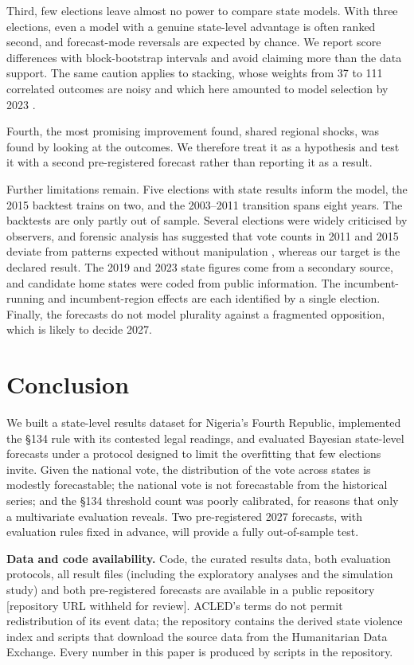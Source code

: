 \documentclass[preprint,12pt,authoryear]{elsarticle}
\begin{document}
Third, few elections leave almost no power to compare state models. With three elections, even a model with a genuine state-level advantage is often ranked second, and forecast-mode reversals are expected by chance. We report score differences with block-bootstrap intervals and avoid claiming more than the data support. The same caution applies to stacking, whose weights from 37 to 111 correlated outcomes are noisy and which here amounted to model selection by 2023 \citep{Claeskens2016Puzzle}.

Fourth, the most promising improvement found, shared regional shocks, was found by looking at the outcomes. We therefore treat it as a hypothesis and test it with a second pre-registered forecast rather than reporting it as a result.

Further limitations remain. Five elections with state results inform the model, the 2015 backtest trains on two, and the 2003--2011 transition spans eight years. The backtests are only partly out of sample. Several elections were widely criticised by observers, and forensic analysis has suggested that vote counts in 2011 and 2015 deviate from patterns expected without manipulation \citep{Tunmibi2021MonteCarlo}, whereas our target is the declared result. The 2019 and 2023 state figures come from a secondary source, and candidate home states were coded from public information. The incumbent-running and incumbent-region effects are each identified by a single election. Finally, the forecasts do not model plurality against a fragmented opposition, which is likely to decide 2027.

\section{Conclusion}
\label{sec:conclusion}
We built a state-level results dataset for Nigeria's Fourth Republic, implemented the \S134 rule with its contested legal readings, and evaluated Bayesian state-level forecasts under a protocol designed to limit the overfitting that few elections invite. Given the national vote, the distribution of the vote across states is modestly forecastable; the national vote is not forecastable from the historical series; and the \S134 threshold count was poorly calibrated, for reasons that only a multivariate evaluation reveals. Two pre-registered 2027 forecasts, with evaluation rules fixed in advance, will provide a fully out-of-sample test.

\vspace{1em}
\noindent\textbf{Data and code availability.} Code, the curated results data, both evaluation protocols, all result files (including the exploratory analyses and the simulation study) and both pre-registered forecasts are available in a public repository [repository URL withheld for review]. ACLED's terms do not permit redistribution of its event data; the repository contains the derived state violence index and scripts that download the source data from the Humanitarian Data Exchange. Every number in this paper is produced by scripts in the repository.
\end{document}
